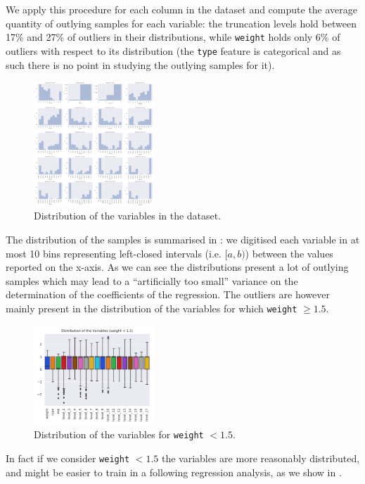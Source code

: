 We apply this procedure for each column in the dataset and compute the average
quantity of outlying samples for each variable: the truncation levels hold
between 17\% and 27\% of outliers in their distributions, while \texttt{weight}
holds only 6\% of outliers with respect to its distribution (the \texttt{type}
feature is categorical and as such there is no point in studying the outlying
samples for it). 
\begin{figure}[htbp]
  \centering
  \includegraphics[width=0.4\textwidth]{img/dataset-distribution_full}
  \caption{Distribution of the variables in the dataset.}
  \label{fig:eda:distr_full}
\end{figure}
The distribution of the samples is summarised in : we
digitised each variable in at most 10 bins representing left-closed intervals
(i.e. $[a, b)$) between the values reported on the x-axis.
As we can see the distributions present a lot of outlying samples which may
lead to a ``artificially too small'' variance on the determination of the
coefficients of the regression.
The outliers are however mainly present in the distribution of the variables for which \texttt{weight} $\ge 1.5$.
\begin{figure}[htbp]
  \centering
  \includegraphics[width=0.4\textwidth]{img/dataset-distribution_box_low}
  \caption{Distribution of the variables for \texttt{weight} $< 1.5$.}
  \label{fig:eda:low_weight}
\end{figure}
In fact if we consider \texttt{weight} $< 1.5$ the variables are more
reasonably distributed, and might be easier to train in a following regression
analysis, as we show in .

